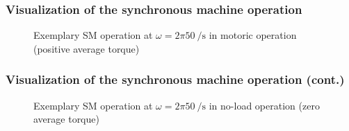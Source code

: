 \begin{frame}
	\frametitle{Visualization of the synchronous machine operation}
    \begin{figure}
        \centering
        \vspace{-0.25cm}
        \caption{Exemplary SM operation at $\omega=2 \pi \SI{50}{\per\second}$ in motoric operation (positive average torque)}
        \label{fig:SM_load_angle_90_animation}
    \end{figure}
\end{frame}

\begin{frame}
	\frametitle{Visualization of the synchronous machine operation (cont.)}
    \begin{figure}
        \centering
        \vspace{-0.25cm}
        \caption{Exemplary SM operation at $\omega=2 \pi \SI{50}{\per\second}$ in no-load operation (zero average torque)}
        \label{fig:SM_load_angle_0_animation}
    \end{figure}
\end{frame}

